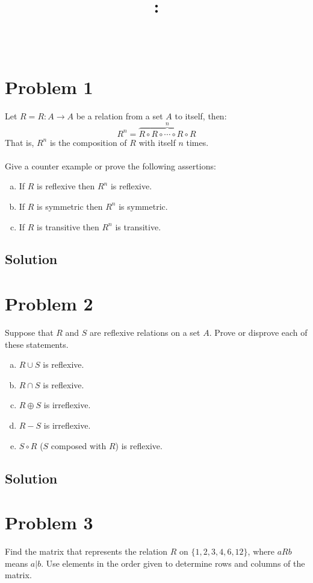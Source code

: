 \documentclass[article, 12pt]{article}
\title{
    \vspace{2in}
    \textmd{\textbf{\courseNumber: \courseName}}
    \normalsize\vspace{0.1in}\\
    \vspace{0.1in}\Large{\text{\psetName}} \\
    \vspace{0.1in}\large{\text{\professor}}
    \vspace{3in}
}
\author{\name}
\date{\dueDate}
\theoremstyle{definition}
\newcommand{\comp}{\circ} %
\begin{document}
    \maketitle
    \thispagestyle{empty}
    \pagebreak

    \section*{Problem 1}
    Let $R = R: A \to A$ be a relation from a set $A$ to itself, then:
    \[ R^n = \overbrace{R \comp R \comp \cdots \comp R \comp R}^n\]
    That is, $R^n$ is the composition of $R$ with itself $n$ times. \\
    \\
    Give a counter example or prove  the following assertions:
    \begin{enumerate}[a.]
        \item If  $R$ is  reflexive then  $R^n$ is reflexive.
        \item If  $R$ is  symmetric  then $R^n$ is symmetric.
        \item If  $R$ is  transitive  then $R^n$ is transitive.
    \end{enumerate}
    \subsection*{Solution}
    \pagebreak
    \section*{Problem 2}
    Suppose that $R$ and $S$ are reflexive relations on a set $A$. Prove or disprove each of these statements.
    \begin{enumerate}[a)]
        \item $R\cup S$ is reflexive.
        \item $R\cap S$ is reflexive.
        \item $R\oplus S$ is irreflexive.
        \item $R - S$ is irreflexive.
        \item $S \comp R$ ($S$ composed with $R$) is reflexive.
    \end{enumerate} 
    \subsection*{Solution}
    \pagebreak
    \section*{Problem 3}
    Find the matrix that represents the  relation $R$ on $\{1,2,3,4,6,12\}$, where $aRb$ means $a | b$. Use elements in the order given to determine rows and columns of the matrix.
\end{document}
